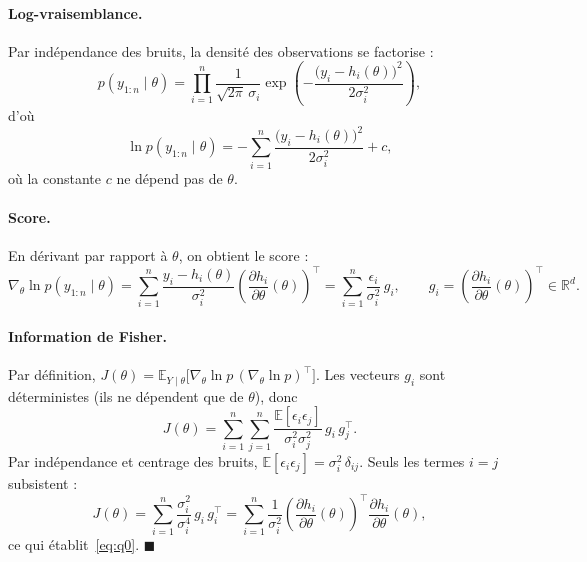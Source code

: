 \documentclass[11pt,a4paper]{article}
\newcommand{\E}{\mathbb{E}}
\theoremstyle{remark}
\begin{document}
\paragraph{Log-vraisemblance.}
Par indépendance des bruits, la densité des observations se factorise :
\begin{equation}
p(y_{1:n} \mid \theta) = \prod_{i=1}^{n} \frac{1}{\sqrt{2\pi}\,\sigma_i}
\exp\!\left(-\frac{\big(y_i - h_i(\theta)\big)^2}{2\sigma_i^2}\right),
\end{equation}
d'où
\begin{equation}
\ln p(y_{1:n} \mid \theta) = -\sum_{i=1}^{n} \frac{\big(y_i - h_i(\theta)\big)^2}{2\sigma_i^2} + c,
\end{equation}
où la constante $c$ ne dépend pas de $\theta$.

\paragraph{Score.}
En dérivant par rapport à $\theta$, on obtient le score :
\begin{equation}
\nabla_\theta \ln p(y_{1:n} \mid \theta)
= \sum_{i=1}^{n} \frac{y_i - h_i(\theta)}{\sigma_i^2} \left(\frac{\partial h_i}{\partial \theta}(\theta)\right)^{\!\top}
= \sum_{i=1}^{n} \frac{\epsilon_i}{\sigma_i^2}\, g_i,
\qquad g_i = \left(\frac{\partial h_i}{\partial \theta}(\theta)\right)^{\!\top} \in \mathbb{R}^d.
\end{equation}

\paragraph{Information de Fisher.}
Par définition, $J(\theta) = \E_{Y\mid\theta}\big[\nabla_\theta \ln p \,(\nabla_\theta \ln p)^\top\big]$. Les vecteurs $g_i$ sont déterministes (ils ne dépendent que de $\theta$), donc
\begin{equation}
J(\theta) = \sum_{i=1}^{n} \sum_{j=1}^{n} \frac{\E[\epsilon_i \epsilon_j]}{\sigma_i^2 \sigma_j^2}\, g_i\, g_j^\top .
\end{equation}
Par indépendance et centrage des bruits, $\E[\epsilon_i \epsilon_j] = \sigma_i^2\, \delta_{ij}$. Seuls les termes $i = j$ subsistent :
\begin{equation}
J(\theta) = \sum_{i=1}^{n} \frac{\sigma_i^2}{\sigma_i^4}\, g_i\, g_i^\top
= \sum_{i=1}^{n} \frac{1}{\sigma_i^2}
\left(\frac{\partial h_i}{\partial \theta}(\theta)\right)^{\!\top}
\frac{\partial h_i}{\partial \theta}(\theta),
\end{equation}
ce qui établit~\eqref{eq:q0}. \hfill$\blacksquare$
\end{document}
